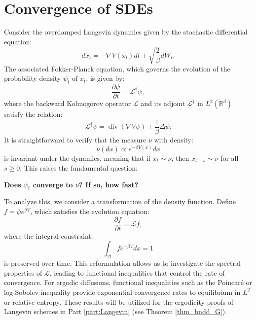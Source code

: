 \documentclass[11pt, twoside]{report}
\begin{document}
\section{Convergence of SDEs}

Consider the overdamped Langevin dynamics given by the stochastic differential equation:
\begin{equation}
dx_t = -\nabla V(x_t) dt + \sqrt{\frac{2}{\beta}} dW_t.
\end{equation}
The associated Fokker-Planck equation, which governs the evolution of the probability density $\psi_t$ of $x_t$, is given by:
\begin{equation}
\frac{\partial \psi}{\partial t} = \mathcal{L}^{\dagger} \psi,
\end{equation}
where the backward Kolmogorov operator $\mathcal{L}$ and its adjoint $\mathcal{L}^{\dagger}$ in $L^2(\mathbb{R}^d)$ satisfy the relation:
\begin{equation}
\mathcal{L}^{\dagger} \psi = \operatorname{div} (\nabla V \psi) + \frac{1}{\beta} \Delta \psi.
\end{equation}
It is straightforward to verify that the measure $\nu$ with density:
\begin{equation}
\nu(dx) \propto e^{-\beta V(x)} dx
\end{equation}
is invariant under the dynamics, meaning that if $x_t \sim \nu$, then $x_{t+s} \sim \nu$ for all $s \geq 0$. This raises the fundamental question:

\begin{center}
\textbf{Does $\psi_t$ converge to $\nu$? If so, how fast?}
\end{center}

To analyze this, we consider a transformation of the density function. Define $f = \psi e^{\beta V}$, which satisfies the evolution equation:
\begin{equation}
\frac{\partial f}{\partial t} = \mathcal{L} f,
\end{equation}
where the integral constraint:
\begin{equation} \label{FP_reform}
\int_{\mathcal{D}} f e^{-\beta V} dx = 1
\end{equation}
is preserved over time. This reformulation allows us to investigate the spectral properties of $\mathcal{L}$, leading to functional inequalities that control the rate of convergence. For ergodic diffusions, functional inequalities such as the Poincar\'{e} or log-Sobolev inequality provide exponential convergence rates to equilibrium in $L^2$ or relative entropy. These results will be utilized for the ergodicity proofs of Langevin schemes in Part \ref{part:Langevin} (see Theorem \ref{thm_bndd_G}).
\end{document}
